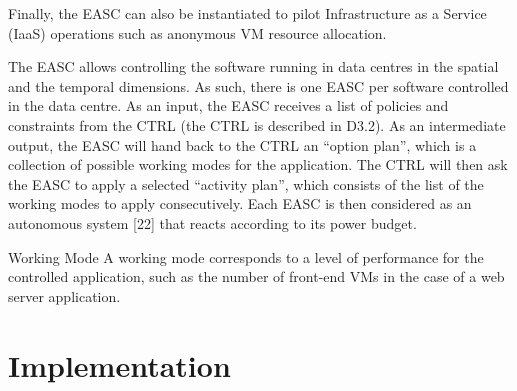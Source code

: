 \documentclass[10pt, conference, compsocconf]{IEEEtran}
\begin{document}
Finally, the EASC can also be instantiated to pilot Infrastructure as a Service (IaaS) operations such as anonymous VM resource allocation.

The EASC allows controlling the software running in data centres in the spatial and the temporal dimensions. As such, there is one EASC per software controlled in the data centre. As an input, the EASC receives a list of policies and constraints from the CTRL (the CTRL is described in D3.2). As an intermediate output, the EASC will hand back to the CTRL an “option plan”, which is a collection of possible working modes for the application. The CTRL will then ask the EASC to apply a selected “activity plan”, which consists of the list of the working modes to apply consecutively. Each EASC is then considered as an autonomous system [22] that reacts according to its power budget.

Working Mode
A working mode corresponds to a level of performance for the controlled application, such as the number of front-end VMs in the case of a web server application.


\section{Implementation}
\end{document}
